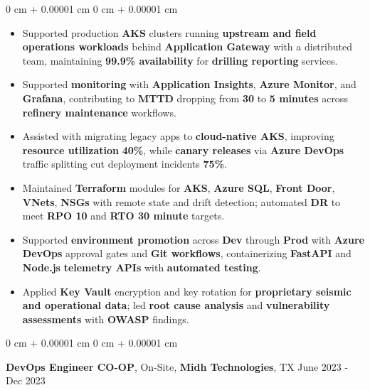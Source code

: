 \documentclass[10pt, letterpaper]{article}
\newenvironment{highlights}{
    \begin{itemize}[
        topsep=0.02 cm,
        parsep=0.02 cm,
        partopsep=0pt,
        itemsep=0pt,
        leftmargin=0 cm + 10pt
    ]
}{
    \end{itemize}
} %
\newenvironment{onecolentry}{
    \begin{adjustwidth}{
        0 cm + 0.00001 cm
    }{
        0 cm + 0.00001 cm
    }
}{
    \end{adjustwidth}
} %
\newcommand{\resumeheading}[2]{%
    \begin{onecolentry}
        #1 \hfill #2
    \end{onecolentry}
} %
\begin{document}
\begin{onecolentry}
\begin{highlights}
	\item Supported production \textbf{AKS} clusters running \textbf{upstream and field operations workloads} behind \textbf{Application Gateway} with a distributed team, maintaining \textbf{99.9\% availability} for \textbf{drilling reporting} services.
	\item Supported \textbf{monitoring} with \textbf{Application Insights}, \textbf{Azure Monitor}, and \textbf{Grafana}, contributing to \textbf{MTTD} dropping from \textbf{30} to \textbf{5 minutes} across \textbf{refinery maintenance} workflows.
	\item Assisted with migrating legacy apps to \textbf{cloud-native AKS}, improving \textbf{resource utilization} \textbf{40\%}, while \textbf{canary releases} via \textbf{Azure DevOps} traffic splitting cut deployment incidents \textbf{75\%}.
	\item Maintained \textbf{Terraform} modules for \textbf{AKS}, \textbf{Azure SQL}, \textbf{Front Door}, \textbf{VNets}, \textbf{NSGs} with remote state and drift detection; automated \textbf{DR} to meet \textbf{RPO 10} and \textbf{RTO 30 minute} targets.
	\item Supported \textbf{environment promotion} across \textbf{Dev} through \textbf{Prod} with \textbf{Azure DevOps} approval gates and \textbf{Git workflows}, containerizing \textbf{FastAPI} and \textbf{Node.js} \textbf{telemetry APIs} with \textbf{automated testing}.
	\item Applied \textbf{Key Vault} encryption and key rotation for \textbf{proprietary seismic and operational data}; led \textbf{root cause analysis} and \textbf{vulnerability assessments} with \textbf{OWASP} findings.
\end{highlights}
\end{onecolentry}



\vspace{0.12 cm}
\resumeheading{\textbf{DevOps Engineer CO-OP}, On-Site, \textbf{Midh Technologies}, TX}{June 2023 - Dec 2023}
\end{document}
